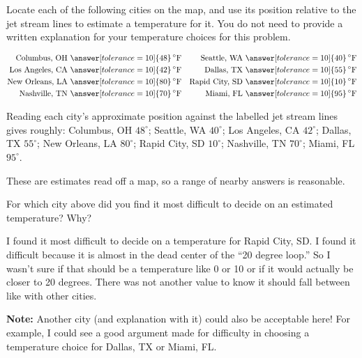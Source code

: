 \documentclass[12pt]{ximera}
\begin{document}
\begin{problem}
Locate each of the following cities on the map, and use its position relative to the
jet stream lines to estimate a temperature for it. You do not need to provide a written
explanation for your temperature choices for this problem.

\begin{align*}
\text{Columbus, OH } &\answer[tolerance=10]{48}\,^\circ\text{F}
&\text{Seattle, WA } &\answer[tolerance=10]{40}\,^\circ\text{F} \\
\text{Los Angeles, CA } &\answer[tolerance=10]{42}\,^\circ\text{F}
&\text{Dallas, TX } &\answer[tolerance=10]{55}\,^\circ\text{F} \\
\text{New Orleans, LA } &\answer[tolerance=10]{80}\,^\circ\text{F}
&\text{Rapid City, SD } &\answer[tolerance=10]{10}\,^\circ\text{F} \\
\text{Nashville, TN } &\answer[tolerance=10]{70}\,^\circ\text{F}
&\text{Miami, FL } &\answer[tolerance=10]{95}\,^\circ\text{F}
\end{align*}

\begin{solution}
Reading each city's approximate position against the labelled jet stream lines gives
roughly: Columbus, OH $48^\circ$; Seattle, WA $40^\circ$; Los Angeles, CA $42^\circ$;
Dallas, TX $55^\circ$; New Orleans, LA $80^\circ$; Rapid City, SD $10^\circ$;
Nashville, TN $70^\circ$; Miami, FL $95^\circ$.

These are estimates read off a map, so a range of nearby answers is reasonable.
\end{solution}
\end{problem}

\begin{problem}
For which city above did you find it most difficult to decide on an estimated
temperature? Why?

\begin{freeResponse}
\end{freeResponse}

\begin{solution}
I found it most difficult to decide on a temperature for Rapid City, SD. I found it
difficult because it is almost in the dead center of the ``20 degree loop.'' So I
wasn't sure if that should be a temperature like 0 or 10 or if it would actually be
closer to 20 degrees. There was not another value to know it should fall between like
with other cities.

\textbf{Note:} Another city (and explanation with it) could also be acceptable here!
For example, I could see a good argument made for difficulty in choosing a temperature
choice for Dallas, TX or Miami, FL.
\end{solution}
\end{problem}
\end{document}
